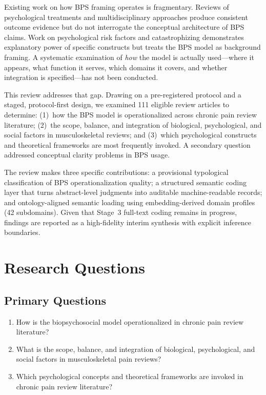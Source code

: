 \documentclass[11pt]{article}
\begin{document}
Existing work on how BPS framing operates is fragmentary. Reviews of psychological treatments \citep{morley1999, williams2020} and multidisciplinary approaches \citep{kamper2015} produce consistent outcome evidence but do not interrogate the conceptual architecture of BPS claims. Work on psychological risk factors \citep{linton2000, pincus2002} and catastrophizing \citep{sullivan1995, keefe2004} demonstrates explanatory power of specific constructs but treats the BPS model as background framing. A systematic examination of \emph{how} the model is actually used---where it appears, what function it serves, which domains it covers, and whether integration is specified---has not been conducted.

This review addresses that gap. Drawing on a pre-registered protocol \citep{osfprotocol2026} and a staged, protocol-first design, we examined 111 eligible review articles to determine: (1)~how the BPS model is operationalized across chronic pain review literature; (2)~the scope, balance, and integration of biological, psychological, and social factors in musculoskeletal reviews; and (3)~which psychological constructs and theoretical frameworks are most frequently invoked. A secondary question addressed conceptual clarity problems in BPS usage.

The review makes three specific contributions: a provisional typological classification of BPS operationalization quality; a structured semantic coding layer that turns abstract-level judgments into auditable machine-readable records; and ontology-aligned semantic loading using embedding-derived domain profiles (42 subdomains). Given that Stage~3 full-text coding remains in progress, findings are reported as a high-fidelity interim synthesis with explicit inference boundaries.

\section{Research Questions}
\label{sec:rqs}

\subsection*{Primary Questions}
\begin{enumerate}[leftmargin=*, label=RQ\arabic*., ref=RQ\arabic*]
  \item \label{rq1} How is the biopsychosocial model operationalized in chronic pain review literature?
  \item \label{rq2} What is the scope, balance, and integration of biological, psychological, and social factors in musculoskeletal pain reviews?
  \item \label{rq3} Which psychological concepts and theoretical frameworks are invoked in chronic pain review literature?
\end{enumerate}
\end{document}
